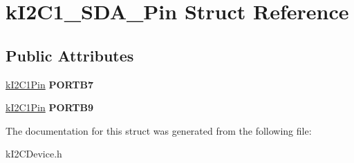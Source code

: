 \hypertarget{structkI2C1__SDA__Pin}{}\section{k\+I2\+C1\+\_\+\+S\+D\+A\+\_\+\+Pin Struct Reference}
\label{structkI2C1__SDA__Pin}
\subsection*{Public Attributes}
\begin{DoxyCompactItemize}
\item 
\hyperlink{structkI2C1Pin}{k\+I2\+C1\+Pin} {\bfseries P\+O\+R\+T\+B7}\hypertarget{structkI2C1__SDA__Pin_aaea93ccfcb4fb47d21ccba0c77f8735b}{}\label{structkI2C1__SDA__Pin_aaea93ccfcb4fb47d21ccba0c77f8735b}

\item 
\hyperlink{structkI2C1Pin}{k\+I2\+C1\+Pin} {\bfseries P\+O\+R\+T\+B9}\hypertarget{structkI2C1__SDA__Pin_aecd86ce8a820396a6c0ab38be46eb1f3}{}\label{structkI2C1__SDA__Pin_aecd86ce8a820396a6c0ab38be46eb1f3}

\end{DoxyCompactItemize}


The documentation for this struct was generated from the following file\+:\begin{DoxyCompactItemize}
\item 
k\+I2\+C\+Device.\+h\end{DoxyCompactItemize}
